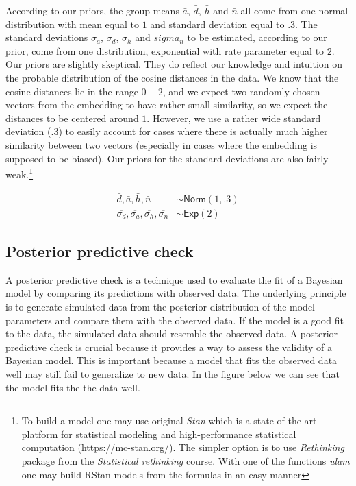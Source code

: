 \documentclass[
  12pt,
  dvipsnames,enabledeprecatedfontcommands]{scrartcl}
\begin{document}
According to our priors, the group means \(\bar{a}\), \(\bar{d}\),
\(\bar{h}\) and \(\bar{n}\) all come from one normal distribution with
mean equal to \(1\) and standard deviation equal to \(.3\). The standard
deviations \(\bar{\sigma_a}\), \(\bar{\sigma_d}\), \(\bar{\sigma_h}\)
and \(\bar{sigma_n}\) to be estimated, according to our prior, come from
one distribution, exponential with rate parameter equal to \(2\). Our
priors are slightly skeptical. They do reflect our knowledge and
intuition on the probable distribution of the cosine distances in the
data. We know that the cosine distances lie in the range \(0-2\), and we
expect two randomly chosen vectors from the embedding to have rather
small similarity, so we expect the distances to be centered around
\(1\). However, we use a rather wide standard deviation (\(.3\)) to
easily account for cases where there is actually much higher similarity
between two vectors (especially in cases where the embedding is supposed
to be biased). Our priors for the standard deviations are also fairly
weak.\footnote{To build a model one may use original \textit{Stan} which is a state-of-the-art platform for statistical modeling and high-performance statistical computation (https://mc-stan.org/). The simpler option is to use \textit{Rethinking} package from the \textit{Statistical rethinking} course. With one of the functions \textit{ulam} one may build RStan models from the formulas in an easy manner}

\begin{align*}
\bar{d}, \bar{a}, \bar{h}, \bar{n} &\sim \mathsf{Norm}(1, .3)\\ 
\overline{\sigma_d}, \overline{\sigma_a},  \overline{\sigma_h},  \overline{\sigma_n}  &\sim \mathsf{Exp}(2)
\end{align*}

\hypertarget{posterior-predictive-check}{%
\subsection{Posterior predictive
check}\label{posterior-predictive-check}}

A posterior predictive check is a technique used to evaluate the fit of
a Bayesian model by comparing its predictions with observed data. The
underlying principle is to generate simulated data from the posterior
distribution of the model parameters and compare them with the observed
data. If the model is a good fit to the data, the simulated data should
resemble the observed data. A posterior predictive check is crucial
because it provides a way to assess the validity of a Bayesian model.
This is important because a model that fits the observed data well may
still fail to generalize to new data. In the figure below we can see
that the model fits the the data well.
\end{document}
